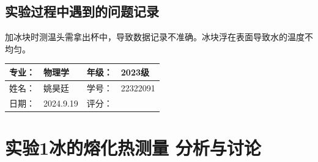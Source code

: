 \documentclass[dvipsnames, svgnames,a4paper,11pt]{article}
\begin{document}
\subsection{实验过程中遇到的问题记录}
加冰块时测温头需拿出杯中，导致数据记录不准确。冰块浮在表面导致水的温度不均匀。


\clearpage
{}
\begin{table}
	\renewcommand\arraystretch{1.7}
	\begin{tabularx}{\textwidth}{|X|X|X|X|}
	\hline
	专业：& 物理学 &年级：& 2023级\\
	\hline
	姓名： &姚昊廷 & 学号：& 22322091\\
	\hline
    日期：&2024.9.19 & 评分： &\\
	\hline
	\end{tabularx}
\end{table}

\section{实验1\hspace{0.3cm}冰的熔化热测量 分析与讨论}
\end{document}
